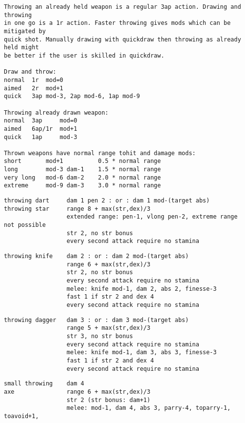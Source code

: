 \goodbreak \small \begin{samepage} \begin{verbatim}
Throwing an already held weapon is a regular 3ap action. Drawing and throwing 
in one go is a 1r action. Faster throwing gives mods which can be mitigated by 
quick shot. Manually drawing with quickdraw then throwing as already held might 
be better if the user is skilled in quickdraw.

Draw and throw:
normal  1r  mod=0
aimed   2r  mod+1
quick   3ap mod-3, 2ap mod-6, 1ap mod-9

Throwing already drawn weapon:
normal  3ap     mod=0
aimed   6ap/1r  mod+1
quick   1ap     mod-3

Thrown weapons have normal range tohit and damage mods:
short       mod+1          0.5 * normal range
long        mod-3 dam-1    1.5 * normal range
very long   mod-6 dam-2    2.0 * normal range
extreme     mod-9 dam-3    3.0 * normal range
\end{verbatim} \blocklistgap \begin{verbatim}
throwing dart     dam 1 pen 2 : or : dam 1 mod-(target abs)
throwing star     range 8 + max(str,dex)/3
                  extended range: pen-1, vlong pen-2, extreme range not possible
                  str 2, no str bonus
                  every second attack require no stamina
\end{verbatim} \blocklistgap \begin{verbatim}
throwing knife    dam 2 : or : dam 2 mod-(target abs)
                  range 6 + max(str,dex)/3
                  str 2, no str bonus
                  every second attack require no stamina
                  melee: knife mod-1, dam 2, abs 2, finesse-3
                  fast 1 if str 2 and dex 4
                  every second attack require no stamina
\end{verbatim} \blocklistgap \begin{verbatim}
throwing dagger   dam 3 : or : dam 3 mod-(target abs)
                  range 5 + max(str,dex)/3
                  str 3, no str bonus
                  every second attack require no stamina
                  melee: knife mod-1, dam 3, abs 3, finesse-3
                  fast 1 if str 2 and dex 4
                  every second attack require no stamina
\end{verbatim} \blocklistgap \begin{verbatim}
small throwing    dam 4
axe               range 6 + max(str,dex)/3
                  str 2 (str bonus: dam+1)
                  melee: mod-1, dam 4, abs 3, parry-4, toparry-1, toavoid+1, 

\end{verbatim}
\end{samepage}
